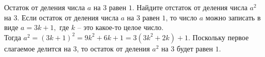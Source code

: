  Остаток от деления числа $a$ на $3$ равен $1$. Найдите отстаток от деления числа $a^2$ на $3$.
\Solution Если остаток от деления числа  $a$ на $3$ равен $1$, то число $a$ можно записать в виде $a=3k+1,$ где $k$ -- это какое-то целое число.\\
Тогда $a^2 = (3k+1)^2 = 9k^2+6k+1 = 3(3k^2+2k)+1.$ Поскольку первое слагаемое делится на $3$, то остаток от деления $a^2$ на $3$ будет равен $1$.\\

